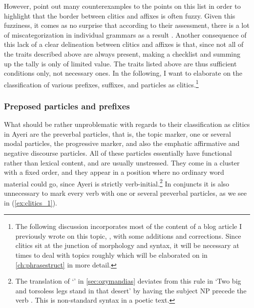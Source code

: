 However, \citet{spencerluis2012} point out many counterexamples to the points
on this list in order to highlight that the border between clitics and affixes
is often fuzzy. Given this fuzziness, it comes as no surprise that according to
their assessment, there is a lot of miscategorization in individual grammars as
a result \citep[107]{spencerluis2012}. Another consequence of this lack of a
clear delineation between clitics and affixes is that, since not all of the
traits described above are always present, making a checklist and summing up
the tally is only of limited value. The traits listed above are thus sufficient
conditions only, not necessary ones. In the following, I want to elaborate on
the classification of various prefixes, suffixes, and particles as
clitics.\footnote{The following discussion incorporates most of the content of
a blog article I previously wrote on this topic, \citet{benung:clitics}, with
some additions and corrections. Since clitics sit at the junction of morphology
and syntax, it will be necessary at times to deal with topics roughly which
will be elaborated on in \autoref{ch:phrasestruct} in more detail.}

\subsubsection{Preposed particles and prefixes}

\label{clitics_preverb} What should be rather unproblematic with regards to
their classification as clitics in Ayeri are the preverbal particles, that is,
the topic marker, one or several modal
particles, the progressive marker, and
also the emphatic affirmative and negative discourse particles. All of these particles essentially have functional rather than
lexical content, and are usually unstressed. They come in a cluster with a fixed
order, and they appear in a position where no ordinary word material could go,
since Ayeri is strictly verb-initial.\footnote{The translation of
`' in \autoref{sec:ozymandias} deviates from this
rule in 
  `Two big and torsoless legs stand in that desert' by having the
subject NP  precede the verb
. This is non-standard syntax in a poetic
text.} In conjuncts it is also unnecessary to mark every verb with one or
several preverbal particles, as we see in (\ref{ex:clitics_1}).

